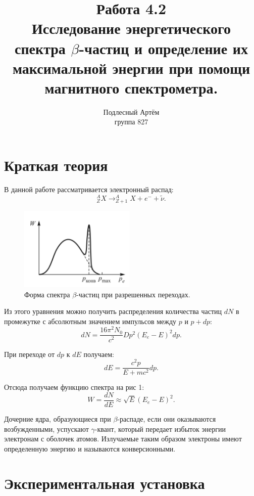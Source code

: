 \documentclass[a4paper, 14pt]{extarticle}%
\author{Подлесный Артём \\ группа 827}
\title{Работа 4.2 \\ Исследование энергетического спектра $\beta$-частиц и определение их максимальной энергии при помощи магнитного спектрометра.}
\newcommand\ECaption[1]{%
     \captionsetup{font=footnotesize}%
     \caption{#1}}
\begin{document}
\maketitle

\section*{Краткая теория}

В данной работе рассматривается электронный распад:
\begin{equation}
_Z^AX \to _{Z+1}^AX+e^-+\widetilde{\nu}.
\end{equation}

\begin{figure}
\begin{center}
\includegraphics[height=4cm]{1.png}
\end{center}
\ECaption{Форма спектра $\beta$-частиц при разрешенных переходах.}
\end{figure}
Из этого уравнения можно получить распределения количества частиц $dN$ в промежутке с абсолютным значением импульсов между $p$ и $p+dp$:
\begin{equation}
dN = \frac{16\pi^2N_0}{c^2}Dp^2(E_e - E)^2dp.
\end{equation}

При переходе от $dp$ к $dE$ получаем:
\begin{equation}
dE = \dfrac{c^2p}{E+mc^2}dp.
\end{equation}

Отсюда получаем функцию спектра на рис 1:
\begin{equation}
W = \dfrac{dN}{dE} \approx \sqrt{E}(E_e-E)^2.
\end{equation}

Дочерние ядра, образующиеся при $\beta$-распаде, если они оказываются возбужденными, успускают $\gamma$-квант, который передает избыток энергии электронам с оболочек атомов. Излучаемые таким образом электроны имеют определенную энергию и называются конверсионными. 

\section*{Экспериментальная установка}
\end{document}
